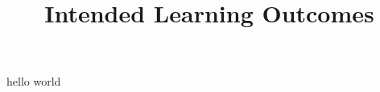\documentclass{article}
\title{Intended Learning Outcomes}
\begin{document}
\maketitle

hello world
\end{document}
